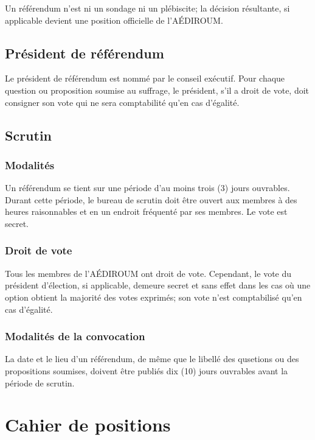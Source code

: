 \documentclass{aediroum}
\begin{document}
Un référendum n'est ni un sondage ni un plébiscite; la décision résultante, si applicable devient une position officielle de l'AÉDIROUM.

\subsection{Président de référendum}\label{sec:president-de-referendum}
Le président de référendum est nommé par le conseil exécutif. Pour chaque question ou proposition soumise au suffrage, le président, s'il a droit de vote, doit consigner son vote qui ne sera comptabilité qu'en cas d'égalité.

\subsection{Scrutin}\label{sec:scrutin}
\subsubsection{Modalités}\label{sec:modalites-scrutin}

Un référendum se tient sur une période d'au moins trois (3) jours ouvrables. Durant cette période, le bureau de scrutin doit être ouvert aux membres à des heures raisonnables et en un endroit fréquenté par ses membres. Le vote est secret.

\subsubsection{Droit de vote}\label{sec:droit-de-vote}

Tous les membres de l'AÉDIROUM ont droit de vote. Cependant, le vote du président d'élection, si applicable, demeure secret et sans effet dans les cas où une option obtient la majorité des votes exprimés; son vote n'est comptabilisé qu'en cas d'égalité.

\subsubsection{Modalités de la convocation}\label{sec:modalites-convocation}

La date et le lieu d'un référendum, de même que le libellé des qusetions ou des propositions soumises, doivent être publiés dix (10) jours ouvrables avant la période de scrutin.

\section{Cahier de positions}\label{sec:cahier-de-positions}
\end{document}

